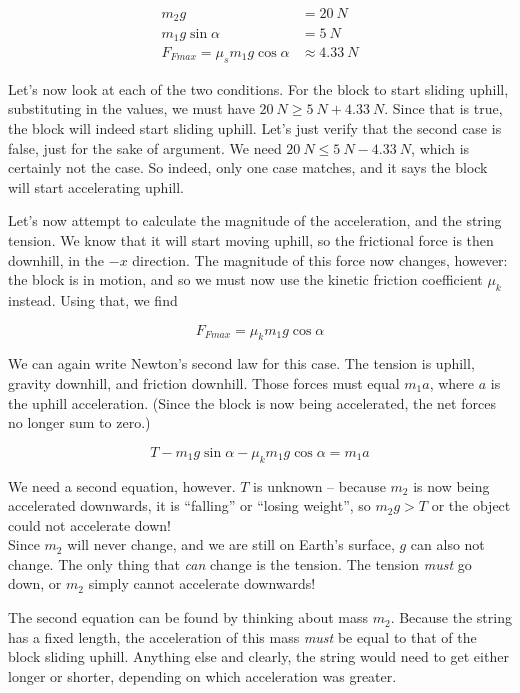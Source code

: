 \begin{align}
m_2 g &= \SI{20}{N}\\
m_1 g \sin \alpha &= \SI{5}{N}\\
F_{Fmax} = \mu_s m_1 g \cos \alpha &\approx \SI{4.33}{N}
\end{align}

Let's now look at each of the two conditions. For the block to start sliding uphill, substituting in the values, we must have $\SI{20}{N} \ge \SI{5}{N} + \SI{4.33}{N}$. Since that is true, the block will indeed start sliding uphill. Let's just verify that the second case is false, just for the sake of argument. We need $\SI{20}{N} \le \SI{5}{N} - \SI{4.33}{N}$, which is certainly not the case. So indeed, only one case matches, and it says the block will start accelerating uphill.

Let's now attempt to calculate the magnitude of the acceleration, and the string tension. We know that it will start moving uphill, so the frictional force is then downhill, in the $-x$ direction. The magnitude of this force now changes, however: the block is in motion, and so we must now use the kinetic friction coefficient $\mu_k$ instead. Using that, we find

\begin{equation}
F_{Fmax} = \mu_k m_1 g \cos \alpha
\end{equation}

We can again write Newton's second law for this case. The tension is uphill, gravity downhill, and friction downhill. Those forces must equal $m_1 a$, where $a$ is the uphill acceleration. (Since the block is now being accelerated, the net forces no longer sum to zero.)

\begin{equation}
T - m_1 g \sin \alpha - \mu_k m_1 g \cos \alpha = m_1 a
\end{equation}

We need a second equation, however. $T$ is unknown -- because $m_2$ is now being accelerated downwards, it is ``falling'' or ``losing weight'', so $m_2 g > T$ or the object could not accelerate down!\\
Since $m_2$ will never change, and we are still on Earth's surface, $g$ can also not change. The only thing that \emph{can} change is the tension. The tension \emph{must} go down, or $m_2$ simply cannot accelerate downwards!

The second equation can be found by thinking about mass $m_2$. Because the string has a fixed length, the acceleration of this mass \emph{must} be equal to that of the block sliding uphill. Anything else and clearly, the string would need to get either longer or shorter, depending on which acceleration was greater.


